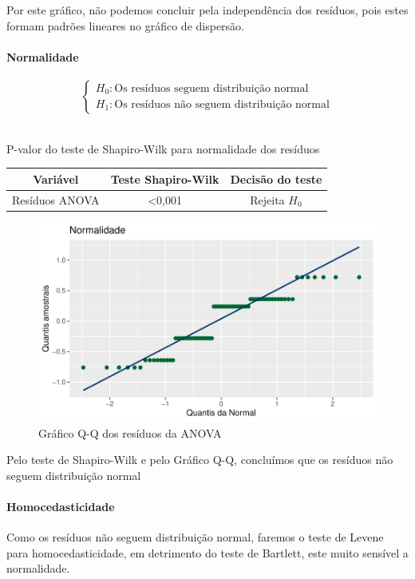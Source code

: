 \documentclass[a4paper, 12pt]{article}
\begin{document}
Por este gráfico, não podemos concluir pela independência dos resíduos, pois estes formam padrões lineares no gráfico de dispersão.

\newpage

\paragraph{Normalidade}

$$\begin{cases}
H_0 : \mbox{Os resíduos seguem distribuição normal}\\
H_1 : \mbox{Os resíduos não seguem distribuição normal}
\end{cases}$$\\

\begin{quadro}[H]
\centering
\caption{P-valor do teste de Shapiro-Wilk para normalidade dos resíduos}
\begin{tabular}{|c|c|c|}
\hline
\textbf{Variável} & \textbf{Teste Shapiro-Wilk} & \textbf{Decisão do teste} \\ \hline Resíduos ANOVA
 & \textless 0,001       & Rejeita $H_0$  \\ \hline  
\end{tabular}
\end{quadro}

\begin{figure}[H]
    \centering
    \caption{Gráfico Q-Q dos resíduos da ANOVA}
    \includegraphics[scale=1]{grafico6.pdf}
\end{figure}

Pelo teste de Shapiro-Wilk e pelo Gráfico Q-Q, concluímos que os resíduos não seguem distribuição normal

\newpage

\paragraph{Homocedasticidade}
\hfill \break
Como os resíduos não seguem distribuição normal, faremos o teste de Levene para homocedasticidade, em detrimento do teste de Bartlett, este muito sensível a normalidade.
\end{document}
